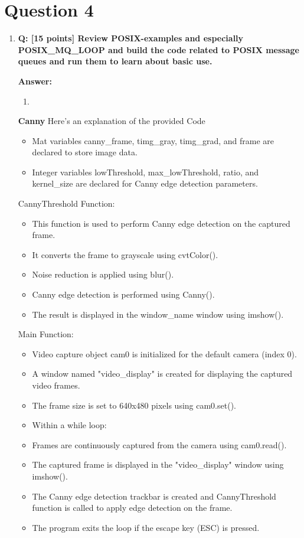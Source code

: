 \documentclass[a4paper,11pt]{article}%
\newenvironment{qanda}{\setlength{\parindent}{0pt}}{\bigskip}
\newcommand{\Q}{\bigskip\bfseries Q: }
\newcommand{\A}{\par\textbf{Answer: } \normalfont}
\begin{document}
\begin{qanda}
\begin{enumerate}
	\end{enumerate}

	\pagebreak
	\section{Question 4}
	\begin{enumerate}
		\item[] \Q [15 points] Review POSIX-examples and especially POSIX\_MQ\_LOOP and build the code
			related to POSIX message queues and run them to learn about basic use.
			\A
			\begin{enumerate}
				\item 
			\end{enumerate}
			
				\textbf{Canny}
				Here's an explanation of the provided Code
				\begin{itemize}
					\item Mat variables canny\_frame, timg\_gray, timg\_grad, and frame are declared to store
					image data.
					\item Integer variables lowThreshold, max\_lowThreshold, ratio, and kernel\_size are declared
					for Canny edge detection parameters.
				\end{itemize}


CannyThreshold Function:
\begin{itemize}
	\item This function is used to perform Canny edge detection on the captured frame.
	\item It converts the frame to grayscale using cvtColor().
	\item Noise reduction is applied using blur().
	\item Canny edge detection is performed using Canny().
	\item The result is displayed in the window\_name window using imshow().
\end{itemize}

Main Function:\
\begin{itemize}
	\item Video capture object cam0 is initialized for the default camera (index 0).
	\item A window named "video\_display" is created for displaying the captured video frames.
	\item The frame size is set to 640x480 pixels using cam0.set().
	\item Within a while loop:
	\item Frames are continuously captured from the camera using cam0.read().
	\item The captured frame is displayed in the "video\_display" window using imshow().
	\item The Canny edge detection trackbar is created and CannyThreshold function is called to
	apply edge detection on the frame.
	\item The program exits the loop if the escape key (ESC) is pressed.
\end{itemize}


\end{enumerate}
\end{qanda}
\end{document}
